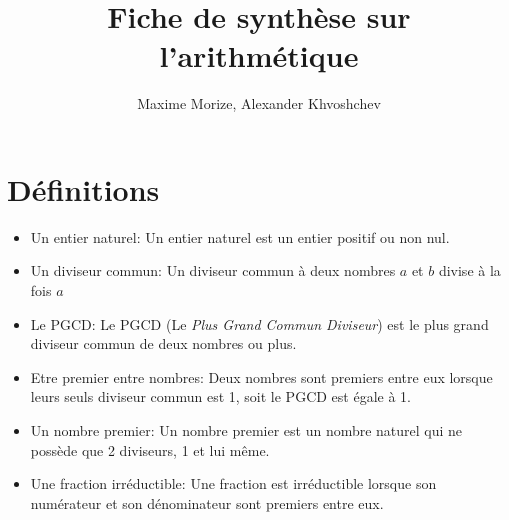 \documentclass[14pt, letterpaper]{article}
\author{Maxime Morize, Alexander Khvoshchev}
\title{Fiche de synth\`ese sur l'arithm\'etique}
\begin{document}
    
\maketitle
\section{D\'efinitions}
\begin{itemize}
  \item{Un entier naturel:}
    Un entier naturel est un entier positif ou non nul.
  \item{Un diviseur commun:}
    Un diviseur commun \`a deux nombres \(a\) et \(b\) divise \`a la fois \(a\)
  \item{Le PGCD:}
    Le PGCD (Le\emph{ Plus Grand Commun Diviseur}) est le plus grand diviseur
    commun de deux nombres ou plus.
  \item{Etre premier entre nombres:}
    Deux nombres sont premiers entre eux lorsque leurs seuls diviseur commun est
    1, soit le PGCD est \'egale \`a 1.
  \item{Un nombre premier:}
    Un nombre premier est un nombre naturel qui ne poss\`ede que 2 diviseurs, 1
    et lui m\^eme.
  \item{Une fraction irr\'eductible:}
    Une fraction est irr\'eductible lorsque son num\'erateur et son
    d\'enominateur sont premiers entre eux.

\end{itemize}
\end{document}
